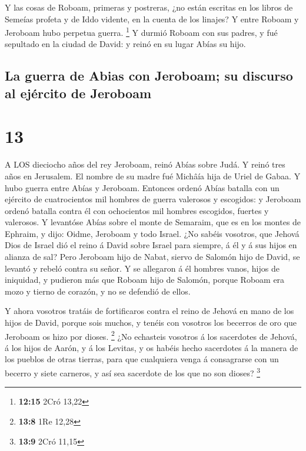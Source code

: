  Y las cosas de Roboam, primeras y postreras, ¿no están
escritas en los libros de Semeías profeta y de Iddo vidente, en la
cuenta de los linajes? Y entre Roboam y Jeroboam hubo perpetua guerra.
\footnote{\textbf{12:15} 2Cró 13,22}  Y durmió Roboam con
sus padres, y fué sepultado en la ciudad de David: y reinó en su lugar
Abías su hijo.

\hypertarget{la-guerra-de-abias-con-jeroboam-su-discurso-al-ejuxe9rcito-de-jeroboam}{%
\subsection{La guerra de Abias con Jeroboam; su discurso al ejército de
Jeroboam}\label{la-guerra-de-abias-con-jeroboam-su-discurso-al-ejuxe9rcito-de-jeroboam}}

\hypertarget{section-12}{%
\section{13}\label{section-12}}

 A LOS dieciocho años del rey Jeroboam, reinó Abías sobre
Judá.  Y reinó tres años en Jerusalem. El nombre de su madre
fué Michâía hija de Uriel de Gabaa. Y hubo guerra entre Abías y
Jeroboam.  Entonces ordenó Abías batalla con un ejército de
cuatrocientos mil hombres de guerra valerosos y escogidos: y Jeroboam
ordenó batalla contra él con ochocientos mil hombres escogidos, fuertes
y valerosos.  Y levantóse Abías sobre el monte de Semaraim,
que es en los montes de Ephraim, y dijo: Oidme, Jeroboam y todo Israel.
 ¿No sabéis vosotros, que Jehová Dios de Israel dió el reino
á David sobre Israel para siempre, á él y á sus hijos en alianza de sal?
 Pero Jeroboam hijo de Nabat, siervo de Salomón hijo de
David, se levantó y rebeló contra su señor.  Y se allegaron
á él hombres vanos, hijos de iniquidad, y pudieron más que Roboam hijo
de Salomón, porque Roboam era mozo y tierno de corazón, y no se defendió
de ellos.

 Y ahora vosotros tratáis de fortificaros contra el reino de
Jehová en mano de los hijos de David, porque sois muchos, y tenéis con
vosotros los becerros de oro que Jeroboam os hizo por dioses.
\footnote{\textbf{13:8} 1Re 12,28}  ¿No echasteis vosotros á
los sacerdotes de Jehová, á los hijos de Aarón, y á los Levitas, y os
habéis hecho sacerdotes á la manera de los pueblos de otras tierras,
para que cualquiera venga á consagrarse con un becerro y siete carneros,
y así sea sacerdote de los que no son dioses? \footnote{\textbf{13:9}
  2Cró 11,15}

